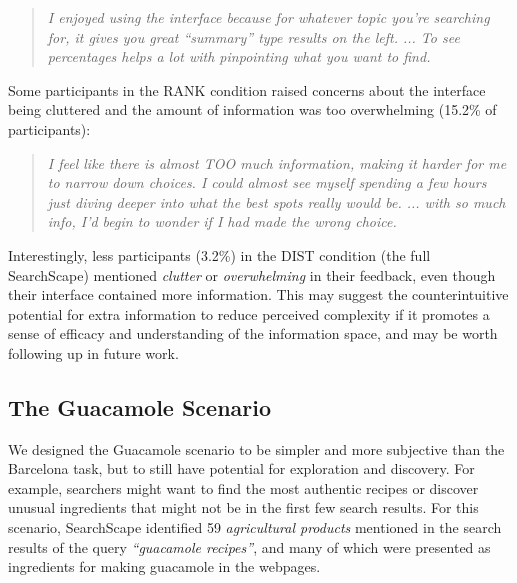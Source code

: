 \blockquote{\emph{I enjoyed using the interface because for whatever topic you're searching for, it gives you great ``summary'' type results on the left. ... To see percentages helps a lot with pinpointing what you want to find.}}


Some participants in the RANK condition raised concerns about the interface being cluttered and the amount of information was too overwhelming (15.2\% of participants):

\blockquote{\emph{I feel like there is almost TOO much information, making it harder for me to narrow down choices. I could almost see myself spending a few hours just diving deeper into what the best spots really would be. ... with so much info, I'd begin to wonder if I had made the wrong choice.}}

Interestingly, less participants (3.2\%) in the DIST condition (the full SearchScape) mentioned \emph{clutter} or \emph{overwhelming} in their feedback, even though their interface contained more information. This may suggest the counterintuitive potential for extra information to reduce perceived complexity if it promotes a sense of efficacy and understanding of the information space, and may be worth following up in future work.



\subsection{The Guacamole Scenario}

We designed the Guacamole scenario to be simpler and more subjective than the Barcelona task, but to still have potential for exploration and discovery. For example, searchers might want to find the most authentic recipes or discover unusual ingredients that might not be in the first few search results.  For this scenario, SearchScape identified 59 \emph{agricultural products} mentioned in the search results of the query \emph{``guacamole recipes''}, and many of which were presented as ingredients for making guacamole in the webpages.
 
